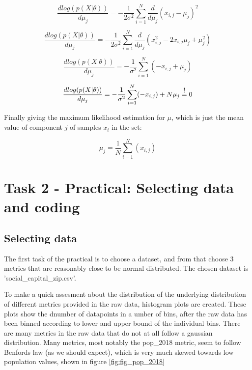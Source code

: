$$
\frac{dlog(p(X|\theta))}{d\mu_j} = -\frac{1}{2\sigma^2}    \sum_{i=1}^{N}    \frac{d}{d\mu_j}
(x_{i,j} - \mu_{j})^2 
$$


$$
\frac{dlog(p(X|\theta))}{d\mu_j} = -\frac{1}{2\sigma^2}    \sum_{i=1}^{N}    \frac{d}{d\mu_j}
(x_{i,j}^2 - 2 x_{i,j} \mu_{j} + \mu_{j}^2 ) 
$$


$$
\frac{dlog(p(X|\theta))}{d\mu_j} = -\frac{1}{\sigma^2}    \sum_{i=1}^{N}   (- x_{i,j}  +  \mu_{j} ) 
$$




$$
\frac{dlog(p(X|\theta))}{d\mu_j} = -\frac{1}{\sigma^2}    \sum_{i=1}^{N}   (- x_{i,j})  +  N\mu_{j}  \stackrel{\normalfont\mbox{!}}{ = } 0
$$

Finally giving the maximum likelihood estimation for $\mu$, which is just the mean value of component $j$ of samples $x_i$ in the set:

$$
\mu_{j}  =   \frac{1}{N} \sum_{i=1}^{N}   (x_{i,j})
$$



\section{Task 2 - Practical: Selecting data and coding}
\subsection{Selecting data}


The first task of the practical is to choose a dataset, and from that choose 3 metrics that are reasonably close to be normal distributed. 
The chosen dataset is 'social\_capital\_zip.csv'.

To make a quick assesment about the distribution of the underlying distribution of different metrics provided in the raw data, histogram plots are created. These plots show the dnumber of datapoints in a umber of bins, after the raw data has been binned according to lower and upper bound of the individual bins. There are many metrics in the raw data that do not at all follow a gaussian distribution. Many metrics, most notably the pop\_2018 metric, seem to follow Benfords law (as we should expect), which is very much skewed towards low population values, shown in figure \ref{fig:fig_pop_2018}






